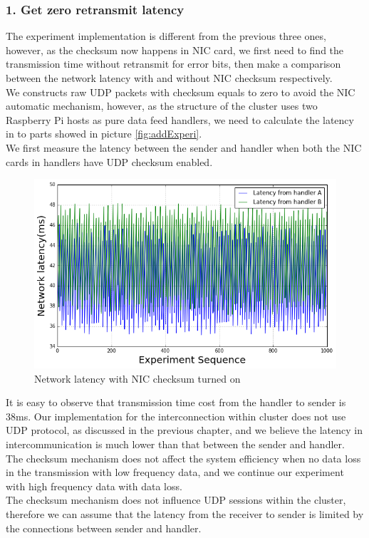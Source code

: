 \documentclass[11pt,openright,a4paper]{report}
\begin{document}
\subsubsection{1. Get zero retransmit latency}
The experiment implementation is different from the previous three ones, however, as the checksum now happens in NIC card, we first need to find the transmission time without retransmit for error bits, then make a comparison between the network latency with and without NIC checksum respectively.\\
We constructs raw UDP packets with checksum equals to zero to avoid the NIC automatic mechanism, however, as the structure of the cluster uses two Raspberry Pi hosts as pure data feed handlers, we need to calculate the latency in to parts showed in picture \ref{fig:addExperi}.\\
We first measure the latency between the sender and handler when both the NIC cards in handlers have UDP checksum enabled.\\
\begin{figure}[H]
	\centering
	\includegraphics[width=0.7\linewidth]{picture/experiments/exp4/latency}
	\caption{Network latency with NIC checksum turned on}
	\label{fig:latency}
\end{figure}
It is easy to observe that transmission time cost from the handler to sender is 38ms. Our implementation for the interconnection within cluster does not use UDP protocol, as discussed in the previous chapter, and we believe the latency in intercommunication is much lower than that between the sender and handler.\\
The checksum mechanism does not affect the system efficiency when no data loss in the transmission with low frequency data, and we continue our experiment with high frequency data with data loss.\\
The checksum mechanism does not influence UDP sessions within the cluster, therefore we can assume that the latency from the receiver to sender is limited by the connections between sender and handler.
\end{document}
